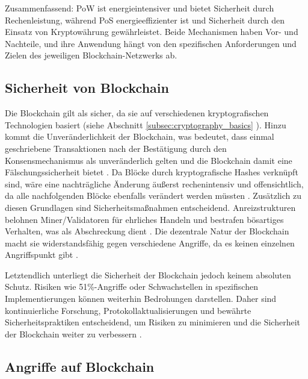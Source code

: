 \noindent Zusammenfassend: PoW ist energieintensiver und bietet Sicherheit durch Rechenleistung, während PoS energieeffizienter ist und Sicherheit durch den Einsatz von Kryptowährung gewährleistet. Beide Mechanismen haben Vor- und Nachteile, und ihre Anwendung hängt von den spezifischen Anforderungen und Zielen des jeweiligen Blockchain-Netzwerks ab.


\subsection{Sicherheit von Blockchain}

Die Blockchain gilt als sicher, da sie auf verschiedenen kryptografischen Technologien basiert (siehe Abschnitt \ref{subsec:cryptography_basics} ). Hinzu kommt die Unveränderlichkeit der Blockchain, was bedeutet, dass einmal geschriebene Transaktionen nach der Bestätigung durch den Konsensmechanismus als unveränderlich gelten und die Blockchain damit eine Fälschungssicherheit bietet \Parencites[S. 1-2]{Landerreche_ImmutabilityOfBlockchains}[S. 70]{Brünnler_BlockchainKurzGut}. Da Blöcke durch kryptografische Hashes verknüpft sind, wäre eine nachträgliche Änderung äußerst rechenintensiv und offensichtlich, da alle nachfolgenden Blöcke ebenfalls verändert werden müssten \Parencite[S. 12]{Fill_BlockchainGrundlagen}. Zusätzlich zu diesen Grundlagen sind Sicherheitsmaßnahmen entscheidend. Anreizstrukturen belohnen Miner/Validatoren für ehrliches Handeln und bestrafen bösartiges Verhalten, was als Abschreckung dient \parencite[S. 320-321]{Antonopoulos_MasteringEthereum}. Die dezentrale Natur der Blockchain macht sie widerstandsfähig gegen verschiedene Angriffe, da es keinen einzelnen Angriffspunkt gibt \parencite[S. 31]{Fill_BlockchainGrundlagen}.

Letztendlich unterliegt die Sicherheit der Blockchain jedoch keinem absoluten Schutz. Risiken wie 51\%-Angriffe oder Schwachstellen in spezifischen Implementierungen können weiterhin Bedrohungen darstellen. Daher sind kontinuierliche Forschung, Protokollaktualisierungen und bewährte Sicherheitspraktiken entscheidend, um Risiken zu minimieren und die Sicherheit der Blockchain weiter zu verbessern \parencites{Nam_51PercentAttacks}{Perez_SmartContractVulnerabilities}.


\subsection{Angriffe auf Blockchain}

